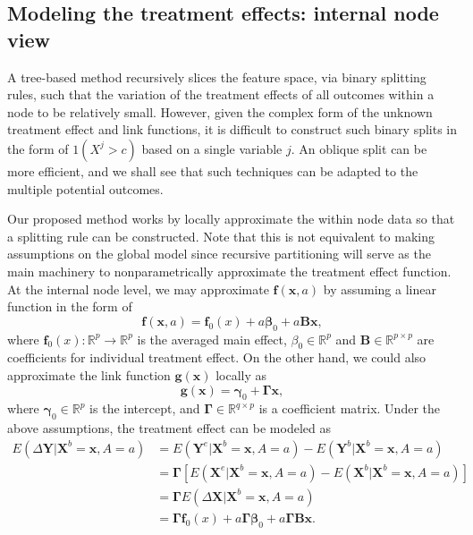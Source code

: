 \documentclass[smallextended]{svjour3}
\begin{document}
\subsection{Modeling the treatment effects: internal node view}\label{Meth}

A tree-based method recursively slices the feature space, via binary splitting rules, such that the variation of the treatment effects of all outcomes within a node to be relatively small. However, given the complex form of the unknown treatment effect and link functions, it is difficult to construct such binary splits \citep{breiman2001random} in the form of $1(X^{j} > c)$ based on a single variable $j$. An oblique split \citep{menze2011oblique} can be more efficient, and we shall see that such techniques can be adapted to the multiple potential outcomes. 

Our proposed method works by locally approximate the within node data so that a splitting rule can be constructed. Note that this is not equivalent to making assumptions on the global model since recursive partitioning will serve as the main machinery to nonparametrically approximate the treatment effect function. At the internal node level, we may approximate $\bm f(\bm x,a)$ by assuming a linear function in the form of
$$\bm f(\bm x,a) = \bm f_0(x) + a \boldsymbol \beta_0 + a\bm B \bm x,$$
where $\bm f_0(x): \mathbb{R}^p \rightarrow \mathbb{R}^p$ is the averaged main effect, $\beta_0 \in \mathbb{R}^p$ and $\bm B \in \mathbb{R}^{p \times p}$ are coefficients for individual treatment effect. On the other hand, we could also approximate the link function $\bm g(\bm x)$ locally as 
$$\bm g(\bm x)= \bm \gamma_0 + \bm \Gamma \bm x,$$
where $\bm \gamma_0 \in \mathbb{R}^p$ is the intercept, and $\bm \Gamma \in \mathbb{R}^{q\times p}$ is a coefficient matrix. Under the above assumptions, the treatment effect can be modeled as
\begin{align}
    E(\Delta \bm Y | \bm X^b = \bm x, A = a) &= E(\bm Y^e | \bm X^b = \bm x, A = a)-E(\bm Y^b | \bm X^b = \bm x, A = a) \nonumber\\
    &=\bm \Gamma \left[E(\bm X^e | \bm X^b=\bm x, A = a) - E(\bm X^b | \bm X^b=\bm x,A = a)\right]\nonumber\\
    &=\bm \Gamma E(\Delta \bm X | \bm X^b=\bm x, A = a)\nonumber\\
    &=\bm \Gamma \bm f_0(x) +  a  \bm \Gamma \boldsymbol \beta_0 + a \bm \Gamma \bm B \bm x. \label{eqn:changeofy}
\end{align} 
\end{document}
